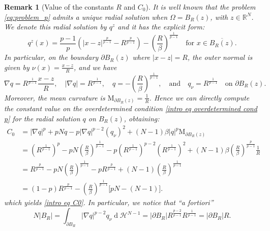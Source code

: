 \documentclass[10pt,a4paper]{amsart}
\numberwithin{equation}{section}
\newcommand{\R}{\mathbb{R}}
\newtheorem{rem}[teo]{Remark}
\renewcommand{\d}[1]{\ensuremath{\operatorname{d}\!{#1}}}
\begin{document}
\begin{rem}[Value of the constants $R$ and $C_0$]
    It is well known that the problem \eqref{eq:problem_p} admits a unique radial solution when $\Omega = B_R(z)$, with $z \in \R^N$. We denote this radial solution by $q^z$ and it has the explicit form:
    \begin{equation*}
        q^z(x) = \frac{p-1}{p} \left(|x-z|^{\frac{p}{p-1}}-R^\frac{p}{p-1}\right) -\left(\frac{R}{\beta}\right)^\frac{1}{p-1} \quad \text{for } x \in \overline{B_R(z)}.
    \end{equation*}
    In particular, on the boundary $\partial B_R(z)$ where $|x-z| = R$, the outer normal is given by $\nu(x) = \frac{x-z}{R}$, and we have
    \begin{equation*}
        \nabla q = R^{\frac{1}{p-1}} \frac{x-z}{R}, \quad |\nabla q| = R^{\frac{1}{p-1}}, \quad q=-\left( \frac{R}{\beta} \right)^{\frac{1}{p-1}},  \quad \text{and} \quad q_\nu = R^{\frac{1}{p-1}} \quad \text{on } \partial B_R(z).
    \end{equation*}
    Moreover, the mean curvature is $\mathrm{M}_{\partial B_R(z)} = \frac{1}{R}$. Hence we can directly compute the constant value on the overdetermined condition \eqref{intro eq overdetermined cond p} for the radial solution $q$ on $B_R(z)$, obtaining:
    \begin{equation*}
        \begin{aligned}
        C_0 
        &= |\nabla q|^p + pNq - p|\nabla q|^{p-2} (q_\nu)^2 + (N-1)\beta|q|^p \mathrm{M}_{\partial B_R(z)} \\
        &= \left( R^{\frac{1}{p-1}} \right)^p - pN \left( \frac{R}{\beta} \right)^{\frac{1}{p-1}} - p \left( R^{\frac{1}{p-1}} \right)^{p-2} \left( R^{\frac{1}{p-1}} \right)^2 + (N-1)\beta \left( \frac{R}{\beta} \right)^{\frac{p}{p-1}} \frac{1}{R} \\
        &= R^{\frac{p}{p-1}} - pN \left( \frac{R}{\beta} \right)^{\frac{1}{p-1}} - p R^{\frac{p}{p-1}} + (N-1) \left( \frac{R}{\beta} \right)^{\frac{1}{p-1}}  \\
        &= (1-p)R^{\frac{p}{p-1}} - \left( \frac{R}{\beta} \right)^{\frac{1}{p-1}} \big[ pN - (N-1) \big].
        \end{aligned}
    \end{equation*}
    which yields \eqref{intro eq C0}. In particular, we notice that ``a fortiori''
    \begin{equation*}
        N|B_R| = \int_{\partial B_R} |\nabla q|^{p-2} q_\nu \d{}\mathcal{H}^{N-1} = |\partial B_R|R^\frac{p-2}{p-1}R^\frac{1}{p-1}=|\partial B_R|R.
    \end{equation*}
\end{rem}
\end{document}
